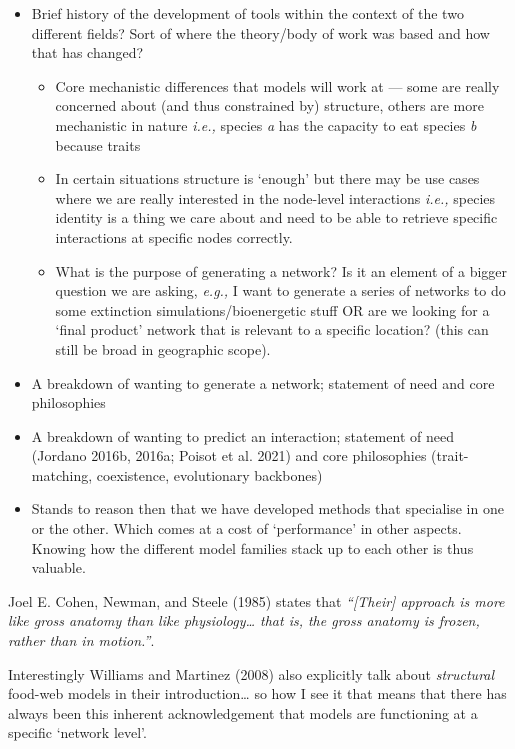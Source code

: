 \documentclass[
  letterpaper,
  DIV=11,
  numbers=noendperiod]{scrartcl}
\begin{document}
\begin{itemize}
\item
  Brief history of the development of tools within the context of the
  two different fields? Sort of where the theory/body of work was based
  and how that has changed?

  \begin{itemize}
  \item
    Core mechanistic differences that models will work at --- some are
    really concerned about (and thus constrained by) structure, others
    are more mechanistic in nature \emph{i.e.,} species \emph{a} has the
    capacity to eat species \emph{b} because traits
  \item
    In certain situations structure is `enough' but there may be use
    cases where we are really interested in the node-level interactions
    \emph{i.e.,} species identity is a thing we care about and need to
    be able to retrieve specific interactions at specific nodes
    correctly.
  \item
    What is the purpose of generating a network? Is it an element of a
    bigger question we are asking, \emph{e.g.,} I want to generate a
    series of networks to do some extinction simulations/bioenergetic
    stuff OR are we looking for a `final product' network that is
    relevant to a specific location? (this can still be broad in
    geographic scope).
  \end{itemize}
\item
  A breakdown of wanting to generate a network; statement of need and
  core philosophies
\item
  A breakdown of wanting to predict an interaction; statement of need
  (Jordano 2016b, 2016a; Poisot et al. 2021) and core philosophies
  (trait-matching, coexistence, evolutionary backbones)
\item
  Stands to reason then that we have developed methods that specialise
  in one or the other. Which comes at a cost of `performance' in other
  aspects. Knowing how the different model families stack up to each
  other is thus valuable.
\end{itemize}

Joel E. Cohen, Newman, and Steele (1985) states that \emph{``{[}Their{]}
approach is more like gross anatomy than like physiology\ldots{} that
is, the gross anatomy is frozen, rather than in motion.''}.

Interestingly Williams and Martinez (2008) also explicitly talk about
\emph{structural} food-web models in their introduction\ldots{} so how I
see it that means that there has always been this inherent
acknowledgement that models are functioning at a specific `network
level'.
\end{document}
